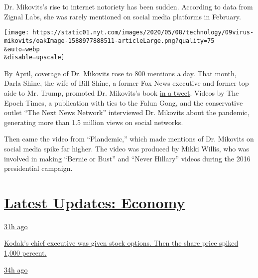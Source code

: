 Dr. Mikovits's rise to internet notoriety has been sudden. According to
data from Zignal Labs, she was rarely mentioned on social media
platforms in February.

\texttt{[image: https://static01.nyt.com/images/2020/05/08/technology/09virus-mikovits/oakImage-1588977888511-articleLarge.png?quality=75\\\&auto=webp\\\&disable=upscale]}

By April, coverage of Dr. Mikovits rose to 800 mentions a day. That
month, Darla Shine, the wife of Bill Shine, a former Fox News executive
and former top aide to Mr. Trump, promoted Dr. Mikovits's book
\href{https://twitter.com/DarlaShine/status/1246607755915526144}{in a
tweet}. Videos by The Epoch Times, a publication with ties to the Falun
Gong, and the conservative outlet ``The Next News Network'' interviewed
Dr. Mikovits about the pandemic, generating more than 1.5 million views
on social networks.

Then came the video from ``Plandemic,'' which made mentions of Dr.
Mikovits on social media spike far higher. The video was produced by
Mikki Willis, who was involved in making ``Bernie or Bust'' and ``Never
Hillary'' videos during the 2016 presidential campaign.

\hypertarget{latest-updates-economy}{%
\section{\texorpdfstring{\href{https://www.nytimes.com/live/2020/07/31/business/stock-market-today-coronavirus?action=click\&pgtype=Article\&state=default\&region=MAIN_CONTENT_1\&context=storylines_live_updates}{Latest
Updates:
Economy}}{Latest Updates: Economy}}\label{latest-updates-economy}}

\href{https://www.nytimes.com/live/2020/07/31/business/stock-market-today-coronavirus?action=click\&pgtype=Article\&state=default\&region=MAIN_CONTENT_1\&context=storylines_live_updates\#kodaks-chief-executive-was-given-stock-options-then-the-share-price-spiked-1000-percent}{31h
ago}

\href{https://www.nytimes.com/live/2020/07/31/business/stock-market-today-coronavirus?action=click\&pgtype=Article\&state=default\&region=MAIN_CONTENT_1\&context=storylines_live_updates\#kodaks-chief-executive-was-given-stock-options-then-the-share-price-spiked-1000-percent}{Kodak's
chief executive was given stock options. Then the share price spiked
1,000 percent.}

\href{https://www.nytimes.com/live/2020/07/31/business/stock-market-today-coronavirus?action=click\&pgtype=Article\&state=default\&region=MAIN_CONTENT_1\&context=storylines_live_updates\#fitch-ratings-downgrades-its-outlook-on-us-debt}{34h
ago}

